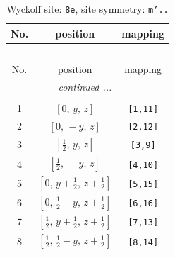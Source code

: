 \documentclass[fleqn,8pt]{jsarticle}
\begin{document}
\begin{longtable}{ccc}
\caption{Wyckoff site: {\tt 8e}, site symmetry: {\tt m'..}}
 \\
 \hline \hline
No. & position & mapping \\ \hline \endfirsthead

\multicolumn{2}{l}{\tablename\ \thetable{}} \\
 \hline \hline
No. & position & mapping \\ \hline \endhead

 \hline \hline
\multicolumn{2}{r}{\footnotesize\it continued ...} \\ \endfoot

 \hline \hline
\multicolumn{2}{r}{} \\ \endlastfoot

1 & $\left[ 0,\, y,\, z \right]$ & {\tt [1,11]} \\ \hline
2 & $\left[ 0,\, - y,\, z \right]$ & {\tt [2,12]} \\ \hline
3 & $\left[ \frac{1}{2},\, y,\, z \right]$ & {\tt [3,9]} \\ \hline
4 & $\left[ \frac{1}{2},\, - y,\, z \right]$ & {\tt [4,10]} \\ \hline
5 & $\left[ 0,\, y + \frac{1}{2},\, z + \frac{1}{2} \right]$ & {\tt [5,15]} \\ \hline
6 & $\left[ 0,\, \frac{1}{2} - y,\, z + \frac{1}{2} \right]$ & {\tt [6,16]} \\ \hline
7 & $\left[ \frac{1}{2},\, y + \frac{1}{2},\, z + \frac{1}{2} \right]$ & {\tt [7,13]} \\ \hline
8 & $\left[ \frac{1}{2},\, \frac{1}{2} - y,\, z + \frac{1}{2} \right]$ & {\tt [8,14]} \\
\end{longtable}
\renewcommand{\arraystretch}{1.2}
\end{document}
